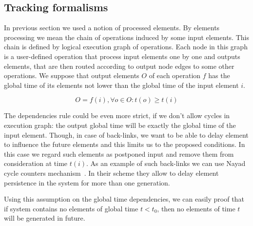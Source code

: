 \subsection{Tracking formalisms}
In previous section we used a notion of processed elements. By elements processing we mean the chain of operations induced by some input elements. This chain is defined by logical execution graph of operations. Each node in this graph is a user-defined operation that process input elements one by one and outputs elements, that are then routed according to output node edges to some other operations. We suppose that output elements $O$ of each operation $f$ has the global time of its elements not lower than the global time of the input element $i$.

\begin{equation}
    O = f(i), \forall o \in O: t(o) \ge t(i)
\end{equation}

The dependencies rule could be even more strict, if we don't allow cycles in execution graph: the output global time will be exactly the global time of the input element. Though, in case of back-links, we want to be able to delay element to influence the future elements and this limits us to the proposed conditions. In this case we regard such elements as postponed input and remove them from consideration at time $t(i)$. As an example of such back-links we can use Nayad cycle counters mechanism~\cite{Murray:2013:NTD:2517349.2522738}. In their scheme they allow to delay element persistence in the system for more than one generation.

Using this assumption on the global time dependencies, we can easily proof that if system contains no elements of global time $t < t_0$, then no elements of time $t$ will be generated in future.

